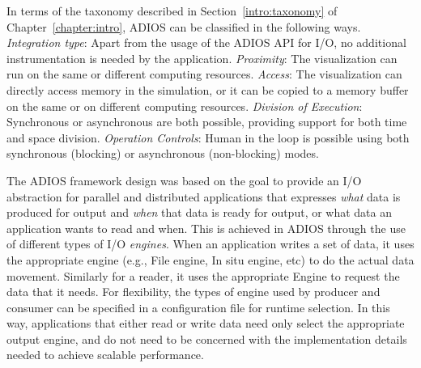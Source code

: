 In terms of the taxonomy described in Section~\ref{intro:taxonomy} of Chapter~\ref{chapter:intro}, ADIOS can be classified in the following ways. \emph{Integration type}: Apart from the usage of the ADIOS API for I/O, no additional instrumentation is needed by the application. \emph{Proximity}: The visualization can run on the same or different computing resources. \emph{Access}: The visualization can directly access memory in the simulation, or it can be copied to a memory buffer on the same or on different computing resources. \emph{Division of Execution}: Synchronous or asynchronous are both possible, providing support for both time and space division.  \emph{Operation Controls}: Human in the loop is possible using both synchronous (blocking) or asynchronous (non-blocking) modes.


The ADIOS framework design was based on the goal to provide an I/O abstraction for parallel and distributed applications that expresses \emph{what} data is produced for output and \emph{when} that data is ready for output, or what data an application wants to read and when\cite{liu2014hello, Logan2020, osti_1468120}.
This is achieved in ADIOS through the use of different types of I/O \emph{engines}. When an application writes a set of data, it uses the appropriate engine (e.g., File engine, In situ engine, etc) to do the actual data movement. Similarly for a reader, it uses the appropriate Engine to request the data that it needs. For flexibility, the types of engine used by producer and consumer can be specified in a configuration file for runtime selection.
In this way, applications that either read or write data need only select the appropriate output engine, and do not need to be concerned with the implementation details needed to achieve scalable performance.



